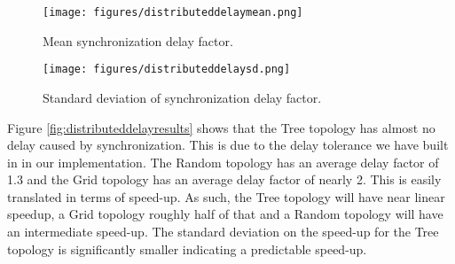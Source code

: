 \begin{figure*}
    \centering
    \begin{subfigure}{0.5\textwidth}
    \centering
        \texttt{[image: figures/distributeddelaymean.png]}
        \caption{Mean synchronization delay factor.}
    \end{subfigure}%
    \begin{subfigure}{0.5\textwidth}
    \centering
        \texttt{[image: figures/distributeddelaysd.png]}
        \caption{Standard deviation of synchronization delay factor.}
    \end{subfigure}
    \caption{Synchronization overhead introduced by topologies.}
    \label{fig:distributeddelayresults}
    \end{figure*}
    
Figure \ref{fig:distributeddelayresults} shows that the Tree topology has almost no delay caused by synchronization. This is due to the delay tolerance we have built in in our implementation. The Random topology has an average delay factor of 1.3 and the Grid topology has an average delay factor of nearly 2. This is easily translated in terms of speed-up. As such, the Tree topology will have near linear speedup, a Grid topology roughly half of that and a Random topology will have an intermediate speed-up. The standard deviation on the speed-up for the Tree topology is significantly smaller indicating a predictable speed-up.


